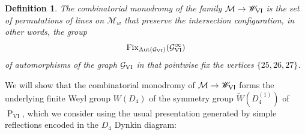 \documentclass[a4paper,reqno]{amsart}
\numberwithin{equation}{section}
\newcommand{\pain}[1]{\operatorname{P}_{\mathrm{#1}}}
\newtheorem{definition}[theorem]{Definition}
\numberwithin{equation}{section}
\begin{document}
\begin{definition} \label{def:combinatorialmonodromyPVI}
    The \emph{combinatorial monodromy} of the family $\mathcal{M}\to\mathscr{W}_{\rm{VI}}$ is the set of permutations of lines on $\mathcal{M}_w$ that preserve the intersection configuration, in other words, the group
    \begin{equation*}
        \operatorname{Fix}_{\operatorname{Aut}(\mathcal{G}_{\rm{VI}})}(\mathcal{G}_{\rm{VI}}^\infty)
    \end{equation*}
    of automorphisms of the graph $\mathcal{G}_{\rm{VI}}$ in  that pointwise fix the vertices $\{{25},{26},{27}\}$.
\end{definition}

We will show that the combinatorial monodromy of $\mathcal{M}\to \mathscr{W}_{\rm{VI}}$ forms the underlying finite Weyl group $W(D_4)$ of the symmetry group $\widetilde{W}(D_4^{(1)})$ of $\pain{VI}$, which we consider using the usual presentation generated by simple reflections encoded in the $D_4$ Dynkin diagram: 
\end{document}
